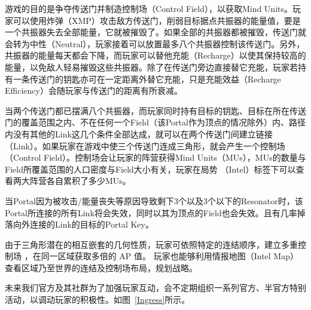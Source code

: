 \documentclass[UTF8]{ctexart}
\begin{document}
\begin{tcolorbox}[breakable]
    游戏的目的是争夺传送门并制造控制场（Control Field），以获取Mind Units。玩家可以使用炸弹（XMP）攻击敌方传送门，削弱目标据点共振器的能量值，要是一个共振器失去全部能量，它就被摧毁了。如果全部的共振器都被摧毁，传送门就会转为中性（Neutral），玩家接着可以放置最多八个共振器控制该传送门。另外，共振器的能量每天都会下降，而玩家可以替他充能（Recharge）以使其保持较高的能量，以免敌人轻易摧毁这些共振器。除了在传送门旁边直接替它充能，玩家若持有一条传送门的钥匙亦可在一定距离外替它充能，只是充能效益（Recharge Efficiency）会随玩家与传送门的距离有所衰减。

    当两个传送门都已摆满八个共振器，而玩家同时持有目标的钥匙、目标在所在传送门的覆盖范围之内、不在任何一个Field（该Portal作为顶点的情况除外）内、路径内没有其他的Link这几个条件全部达成，就可以在两个传送门间建立链接（Link）。如果玩家在游戏中使三个传送门连成三角形，就会产生一个控制场（Control Field）。控制场会让玩家的阵营获得Mind Units（MUs），MUs的数量与Field所覆盖范围的人口密度与Field大小有关，玩家在局势 （Intel）标签下可以查看两大阵营各自累积了多少MUs。

    当Portal因为被攻击/能量丧失等原因导致剩下3个以及3个以下的Resonator时，该Portal所连接的所有Link将会失效，同时以其为顶点的Field也会失效。且有几率掉落向外连接的Link的目标的Portal Key。

    由于三角形潜在的相互嵌套的几何性质，玩家可依照特定的连结顺序，建立多重控制场 ，在同一区域获取多倍的 AP 值。 玩家也能够利用情报地图（Intel Map）查看区域乃至世界的连结及控制场布局，规划战略。\cite{wiki:Ingress}
\end{tcolorbox}


未来我们官方及其社群为了加强玩家互动，会不定期组织一系列官方、半官方特别活动，以调动玩家的积极性。如图~\ref{Ingress}所示。
\end{document}

